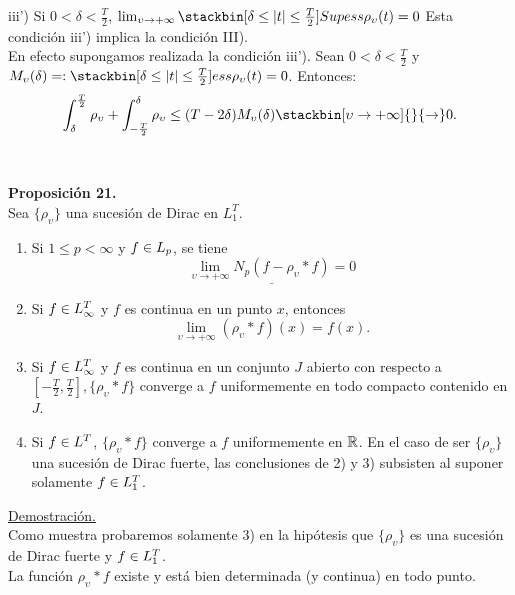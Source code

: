 iii') Si $0<\delta < \frac{T}{2}$, $\lim_{\upsilon \to +\infty} \stackbin[\delta \leq |t| \leq \frac{T}{2}]{}{Sup} ess \rho_\upsilon (t)=0$
Esta condición iii') implica la condición III). \\
En efecto supongamos realizada la condición iii'). Sean $0<\delta<\frac{T}{2}$ y $M_\upsilon (\delta)=:\stackbin[\delta \leq |t| \leq \frac{T}{2}]{}{ess \rho_\upsilon (t)}= 0$. Entonces:
$$
\int_{\delta}^{\frac{T}{2}} \rho_\upsilon + \int_{-\frac{T}{2}}^\delta \rho_\upsilon \leq (T-2\delta )M_\upsilon (\delta) \stackbin[\upsilon \to +\infty]{}{\flecha} 0.
$$
\\ \\
\textbf{Proposición 21.} \\
Sea $\lbrace \rho_\upsilon \rbrace$ una sucesión de Dirac en $L_1^T$.
\begin{enumerate}[1)]
\item Si $1 \leq p < \infty$ y $f \in L_p$, se tiene
$$
\underline{\lim_{\upsilon \to +\infty}N_p (f-\rho_\upsilon * f)=0}
$$
\item Si $f \in L_\infty^T$ y $f$ es continua en un punto $x$, entonces
$$
\lim_{\upsilon \to +\infty} (\rho_\upsilon * f)(x)=f(x).
$$
\item Si $f \in L_\infty^T$ y $f$ es continua en un conjunto $J$ abierto con respecto a $[-\frac{T}{2},\frac{T}{2}], \lbrace \rho_\upsilon * f \rbrace$ converge a $f$ uniformemente en todo compacto contenido en $J$.
\item Si $f \in 	L^T$, $\lbrace \rho_\upsilon * f \rbrace$ converge a $f$ uniformemente en $\mathbb{R}$. En el caso de ser $\lbrace \rho_\upsilon \rbrace$ una sucesión de Dirac fuerte, las conclusiones de 2) y 3) subsisten al suponer solamente $f \in L_1^T$.
\end{enumerate}

\underline{Demostración.}\\
Como muestra probaremos solamente 3) en la hipótesis que $\lbrace \rho_\upsilon \rbrace$ es una sucesión de Dirac fuerte y $f \in L_1^T$. \\
La función $\rho_\upsilon * f$ existe y está bien determinada (y continua) en todo punto. \\

